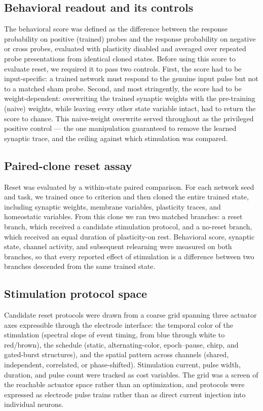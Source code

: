 \documentclass{article}
\begin{document}
\subsection*{Behavioral readout and its controls}

The behavioral score was defined as the difference between the response probability on positive (trained) probes and the response probability on negative or cross probes, evaluated with plasticity disabled and averaged over repeated probe presentations from identical cloned states. Before using this score to evaluate reset, we required it to pass two controls. First, the score had to be input-specific: a trained network must respond to the genuine input pulse but not to a matched sham probe. Second, and most stringently, the score had to be weight-dependent: overwriting the trained synaptic weights with the pre-training (naive) weights, while leaving every other state variable intact, had to return the score to chance. This naive-weight overwrite served throughout as the privileged positive control --- the one manipulation guaranteed to remove the learned synaptic trace, and the ceiling against which stimulation was compared.

\subsection*{Paired-clone reset assay}

Reset was evaluated by a within-state paired comparison. For each network seed and task, we trained once to criterion and then cloned the entire trained state, including synaptic weights, membrane variables, plasticity traces, and homeostatic variables. From this clone we ran two matched branches: a reset branch, which received a candidate stimulation protocol, and a no-reset branch, which received an equal duration of plasticity-on rest. Behavioral score, synaptic state, channel activity, and subsequent relearning were measured on both branches, so that every reported effect of stimulation is a difference between two branches descended from the same trained state.

\subsection*{Stimulation protocol space}

Candidate reset protocols were drawn from a coarse grid spanning three actuator axes expressible through the electrode interface: the temporal color of the stimulation (spectral slope of event timing, from blue through white to red/brown), the schedule (static, alternating-color, epoch--pause, chirp, and gated-burst structures), and the spatial pattern across channels (shared, independent, correlated, or phase-shifted). Stimulation current, pulse width, duration, and pulse count were tracked as cost variables. The grid was a screen of the reachable actuator space rather than an optimization, and protocols were expressed as electrode pulse trains rather than as direct current injection into individual neurons.
\end{document}
